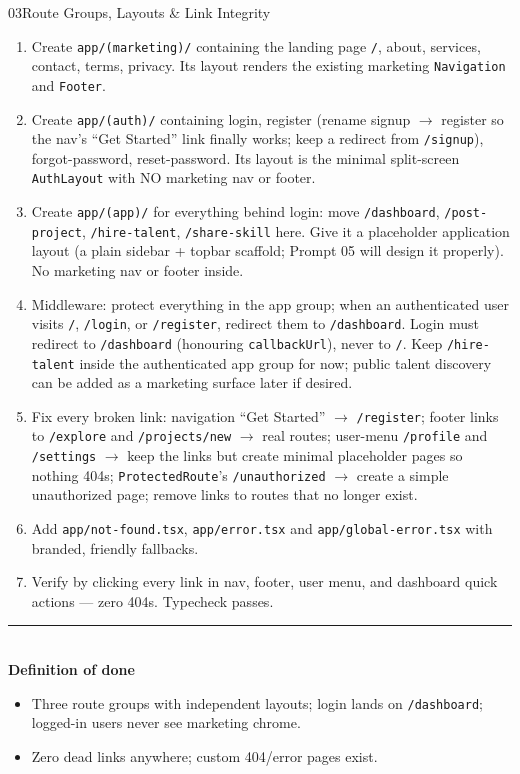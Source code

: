 \documentclass[11pt,a4paper]{article}
\newcommand{\dod}{\medskip\noindent\textcolor{donegreen}{\rule{\linewidth}{0.5pt}}\\[1mm]\textbf{\textcolor{donegreen}{Definition of done}}\\[-2mm]}
\newcommand{\filepath}[1]{\texttt{#1}}
\begin{document}
\begin{promptbox}{03}{Route Groups, Layouts \& Link Integrity}
\begin{enumerate}[leftmargin=1.6em]
  \item Create \texttt{app/(marketing)/} containing the landing page \texttt{/},
        about, services, contact, terms, privacy. Its layout renders the existing
        marketing \texttt{Navigation} and \texttt{Footer}.
  \item Create \texttt{app/(auth)/} containing login, register (rename signup
        $\rightarrow$ register so the nav's ``Get Started'' link finally works; keep a
        redirect from \texttt{/signup}), forgot-password, reset-password. Its layout
        is the minimal split-screen \texttt{AuthLayout} with NO marketing nav or
        footer.
  \item Create \texttt{app/(app)/} for everything behind login: move
        \texttt{/dashboard}, \texttt{/post-project}, \texttt{/hire-talent},
        \texttt{/share-skill} here. Give it a placeholder application layout (a plain
        sidebar + topbar scaffold; Prompt 05 will design it properly). No marketing
        nav or footer inside.
  \item Middleware: protect everything in the app group; when an authenticated user
        visits \texttt{/}, \texttt{/login}, or \texttt{/register}, redirect them to
        \texttt{/dashboard}. Login must redirect to \texttt{/dashboard} (honouring
        \texttt{callbackUrl}), never to \texttt{/}. Keep \texttt{/hire-talent} inside
        the authenticated app group for now; public talent discovery can be added as
        a marketing surface later if desired.
  \item Fix every broken link: navigation ``Get Started'' $\rightarrow$
        \texttt{/register}; footer links to \texttt{/explore} and
        \texttt{/projects/new} $\rightarrow$ real routes; user-menu
        \texttt{/profile} and \texttt{/settings} $\rightarrow$ keep the links but
        create minimal placeholder pages so nothing 404s; \texttt{ProtectedRoute}'s
        \texttt{/unauthorized} $\rightarrow$ create a simple unauthorized page;
        remove links to routes that no longer exist.
  \item Add \filepath{app/not-found.tsx}, \filepath{app/error.tsx} and
        \filepath{app/global-error.tsx} with branded, friendly fallbacks.
  \item Verify by clicking every link in nav, footer, user menu, and dashboard quick
        actions --- zero 404s. Typecheck passes.
\end{enumerate}

\dod
\begin{itemize}[leftmargin=1.6em]
  \item Three route groups with independent layouts; login lands on
        \texttt{/dashboard}; logged-in users never see marketing chrome.
  \item Zero dead links anywhere; custom 404/error pages exist.
\end{itemize}
\end{promptbox}
\end{document}
